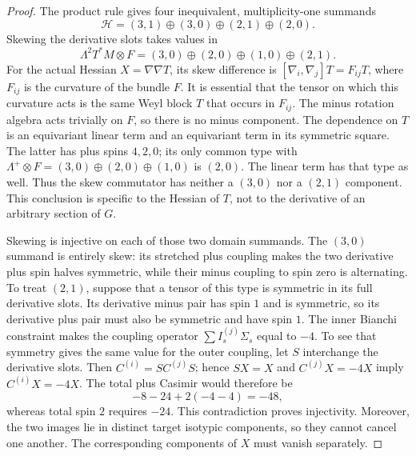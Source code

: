 \begin{proof}
The product rule gives four inequivalent, multiplicity-one summands
\[
 \mathcal H=(3,1)\oplus(3,0)\oplus(2,1)\oplus(2,0).
\]
Skewing the derivative slots takes values in
\[
 \Lambda^2T^*M\otimes F=(3,0)\oplus(2,0)\oplus(1,0)\oplus(2,1).
\]
For the actual Hessian $X=\nabla\nabla T$, its skew difference is
$[\nabla_i,\nabla_j]T=F_{ij}T$, where $F_{ij}$ is the curvature of the
bundle $F$. It is essential that the tensor on which this curvature
acts is the same Weyl block $T$ that occurs in $F_{ij}$. The minus
rotation algebra acts trivially on $F$, so there is no minus component.
The dependence on $T$ is an equivariant linear term and an equivariant
term in its symmetric square. The latter has plus spins $4,2,0$;
its only common type with $\Lambda^+\otimes F=(3,0)\oplus(2,0)\oplus(1,0)$
is $(2,0)$. The linear term has that type as well. Thus the skew
commutator has neither a $(3,0)$ nor a $(2,1)$ component. This conclusion
is specific to the Hessian of $T$, not to the derivative of an arbitrary
section of $G$.

Skewing is injective on each of those two domain summands.  The
\((3,0)\) summand is entirely skew: its stretched plus coupling makes the
two derivative plus spin halves symmetric, while their minus coupling
to spin zero is alternating.  To treat \((2,1)\), suppose that a tensor
of this type is symmetric in its full derivative slots.  Its derivative
minus pair has spin \(1\) and is symmetric, so its derivative plus pair
must also be symmetric and have spin \(1\).  The inner Bianchi constraint
makes the coupling operator \(\sum I_s^{(j)}\Sigma_s\) equal to \(-4\).
To see that symmetry gives the same value for the outer coupling,
let $S$ interchange the derivative slots. Then
$C^{(i)}=SC^{(j)}S$; hence $SX=X$ and $C^{(j)}X=-4X$ imply
$C^{(i)}X=-4X$.  The total plus Casimir would therefore be
\[
 -8-24+2(-4-4)=-48,
\]
whereas total spin \(2\) requires \(-24\).  This contradiction proves
injectivity.  Moreover, the two images lie in distinct target isotypic
components, so they cannot cancel one another.  The corresponding
components of \(X\) must vanish separately.


\end{proof}

